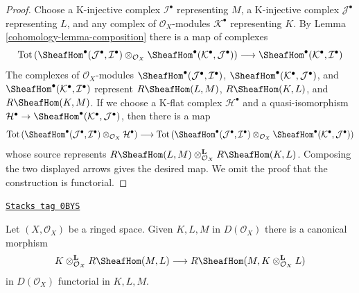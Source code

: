 \begin{proof}

Choose a K-injective complex $\mathcal{I}^\bullet$ representing $M$,
a K-injective complex $\mathcal{J}^\bullet$ representing $L$, and
any complex of $\mathcal{O}_X$-modules $\mathcal{K}^\bullet$ representing $K$.
By Lemma \ref{cohomology-lemma-composition} there is a map of complexes
$$
\text{Tot}\left(
\SheafHom^\bullet(\mathcal{J}^\bullet, \mathcal{I}^\bullet)
\otimes_{\mathcal{O}_X}
\SheafHom^\bullet(\mathcal{K}^\bullet, \mathcal{J}^\bullet)
\right)
\longrightarrow
\SheafHom^\bullet(\mathcal{K}^\bullet, \mathcal{I}^\bullet)
$$
The complexes of $\mathcal{O}_X$-modules
$\SheafHom^\bullet(\mathcal{J}^\bullet, \mathcal{I}^\bullet)$,
$\SheafHom^\bullet(\mathcal{K}^\bullet, \mathcal{J}^\bullet)$, and
$\SheafHom^\bullet(\mathcal{K}^\bullet, \mathcal{I}^\bullet)$
represent $R\SheafHom(L, M)$, $R\SheafHom(K, L)$, and $R\SheafHom(K, M)$.
If we choose a K-flat complex $\mathcal{H}^\bullet$ and a quasi-isomorphism
$\mathcal{H}^\bullet \to
\SheafHom^\bullet(\mathcal{K}^\bullet, \mathcal{J}^\bullet)$,
then there is a map
$$
\text{Tot}\left(
\SheafHom^\bullet(\mathcal{J}^\bullet, \mathcal{I}^\bullet)
\otimes_{\mathcal{O}_X} \mathcal{H}^\bullet
\right)
\longrightarrow
\text{Tot}\left(
\SheafHom^\bullet(\mathcal{J}^\bullet, \mathcal{I}^\bullet)
\otimes_{\mathcal{O}_X}
\SheafHom^\bullet(\mathcal{K}^\bullet, \mathcal{J}^\bullet)
\right)
$$
whose source represents
$R\SheafHom(L, M) \otimes_{\mathcal{O}_X}^\mathbf{L} R\SheafHom(K, L)$.
Composing the two displayed arrows gives the desired map. We omit the
proof that the construction is functorial.
\end{proof}

\begin{lemma}
\label{cohomology-lemma-internal-hom-diagonal-better}
\href{https://stacks.math.columbia.edu/tag/0BYS}{\texttt{Stacks tag 0BYS}}

Let $(X, \mathcal{O}_X)$ be a ringed space. Given $K, L, M$
in $D(\mathcal{O}_X)$ there is a canonical morphism
$$
K \otimes_{\mathcal{O}_X}^\mathbf{L} R\SheafHom(M, L)
\longrightarrow
R\SheafHom(M, K \otimes_{\mathcal{O}_X}^\mathbf{L} L)
$$
in $D(\mathcal{O}_X)$ functorial in $K, L, M$.
\end{lemma}

